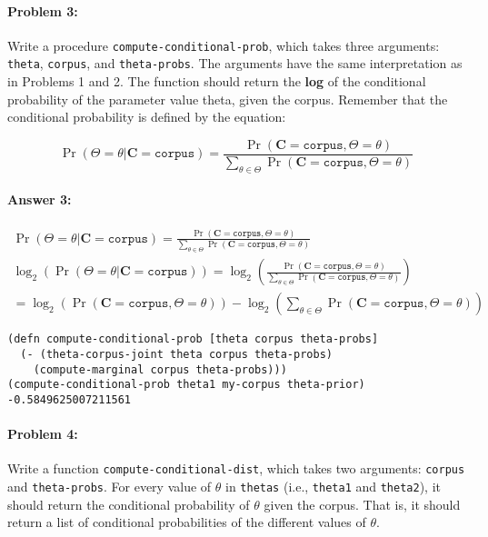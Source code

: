 \documentclass[12pt, letterpaper]{article}
\begin{document}
\hrulefill
\paragraph{Problem 3:}

Write a procedure \texttt{compute-conditional-prob}, which takes three
arguments: \texttt{theta}, \texttt{corpus}, and
\texttt{theta-probs}. The arguments have the same interpretation as in
Problems 1 and 2. The function should return the \textbf{log} of the
conditional probability of the parameter value theta, given the
corpus. Remember that the conditional probability is defined by the
equation:

\begin{equation}
  \Pr(\Theta=\theta|\mathbf{C}=\texttt{corpus}) = \frac{\Pr(\mathbf{C}=\texttt{corpus},\Theta=\theta)}{\sum_{\theta \in \Theta} \Pr(\mathbf{C}=\texttt{corpus}, \Theta=\theta)}
\end{equation}

\paragraph{Answer 3:}\begin{gather*}
    \Pr(\Theta=\theta|\mathbf{C}=\texttt{corpus}) = \frac{\Pr(\mathbf{C}=\texttt{corpus},\Theta=\theta)}{\sum_{\theta \in \Theta} \Pr(\mathbf{C}=\texttt{corpus}, \Theta=\theta)}\\
    \log_2(\Pr(\Theta=\theta|\mathbf{C}=\texttt{corpus})) = \log_2\left(\frac{\Pr(\mathbf{C}=\texttt{corpus},\Theta=\theta)}{\sum_{\theta \in \Theta}\Pr(\mathbf{C}=\texttt{corpus}, \Theta=\theta)}\right)\\
    = \log_2(\Pr(\mathbf{C}=\texttt{corpus},\Theta=\theta))-\log_2\left(\sum_{\theta \in \Theta}\Pr(\mathbf{C}=\texttt{corpus}, \Theta=\theta)\right)
\end{gather*}
\begin{lstlisting}
(defn compute-conditional-prob [theta corpus theta-probs]
  (- (theta-corpus-joint theta corpus theta-probs)
    (compute-marginal corpus theta-probs)))
(compute-conditional-prob theta1 my-corpus theta-prior)
-0.5849625007211561
\end{lstlisting}

\hrulefill
\paragraph{Problem 4:}

Write a function \texttt{compute-conditional-dist}, which takes two
arguments: \texttt{corpus} and \texttt{theta-probs}. For every value
of $\theta$ in \texttt{thetas} (i.e., \texttt{theta1} and
\texttt{theta2}), it should return the conditional probability of
$\theta$ given the corpus. That is, it should return a list of
conditional probabilities of the different values of $\theta$.
\end{document}
